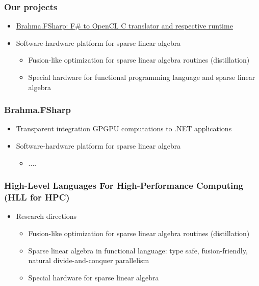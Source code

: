 \documentclass[xcolor=table,aspectratio=169]{beamer}
\begin{document}
\begin{frame}[fragile]
  \frametitle{Our projects}
  \begin{itemize}
    \item \href{https://github.com/YaccConstructor/Brahma.FSharp}{Brahma.FSharp: F\# to OpenCL C translator and respective runtime}
    \pause
    \item Software-hardware platform for sparse linear algebra
    \begin{itemize}
      \item Fusion-like optimization for sparse linear algebra routines (distillation)
      \item Special hardware for functional programming language and sparse linear algebra
    \end{itemize}
  \end{itemize}
 
\end{frame}

\begin{frame}[fragile]
  \frametitle{Brahma.FSharp}
  \begin{itemize}
    \item Transparent integration GPGPU computations to .NET applications
    \pause
    \item Software-hardware platform for sparse linear algebra
    \begin{itemize}
      \item ....
    \end{itemize}
  \end{itemize}
 
\end{frame}

\begin{frame}[fragile]
  \frametitle{High-Level Languages For High-Performance Computing (HLL for HPC)}
  
  \begin{itemize}      
  \item Research directions
  \begin{itemize}
    \item Fusion-like optimization for sparse linear algebra routines (distillation)
    \item Sparse linear algebra in functional language: type safe, fusion-friendly, natural divide-and-conquer parallelism
    \item Special hardware for sparse linear algebra
  \end{itemize}
  \end{itemize}
\end{frame}
\end{document}

